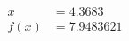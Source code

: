\documentclass[preview]{standalone}
\begin{document}
\begin{align*}
x &= 4.3683\\f(x) &= 7.9483621
\end{align*}
\end{document}
